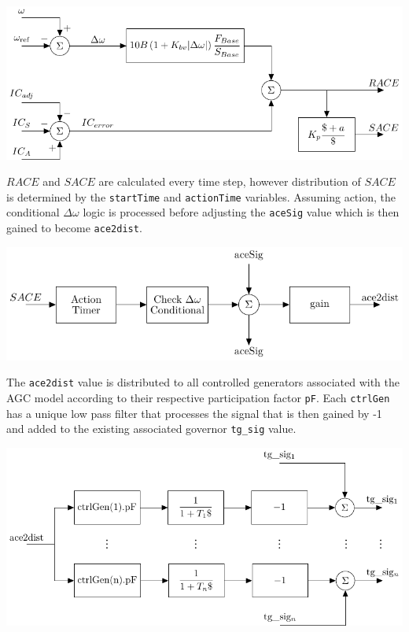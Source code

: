 \documentclass[12pt]{article}
\begin{document}
\begin{center}
\includegraphics[width=.75\linewidth]{200722-AGCblockdiagram-p1}
\end{center}

$RACE$ and $SACE$ are calculated every time step, however
distribution of $SACE$ is determined by the \verb|startTime| and \verb|actionTime| variables.
Assuming action, the conditional $\Delta\omega$ logic is processed before adjusting the \verb|aceSig| value which is then gained to become \verb|ace2dist|.

\begin{center}
\includegraphics[width=.75\linewidth]{200722-AGCblockdiagram-p2}
\end{center}

The \verb|ace2dist| value is distributed to all controlled generators associated with the AGC model according to their respective participation factor \verb|pF|.
Each \verb|ctrlGen| has a unique low pass filter that processes the signal that is then gained by -1 and added to the existing associated governor \verb|tg_sig| value.

\begin{center}
\includegraphics[width=.75\linewidth]{200722-AGCblockdiagram-p3}
\end{center}


\pagebreak
\end{document}
